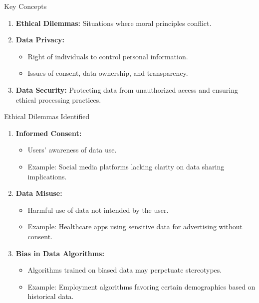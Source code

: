 \documentclass[aspectratio=169]{beamer}
\begin{document}
\begin{frame}[fragile]{Key Concepts}
  \begin{enumerate}
    \item \textbf{Ethical Dilemmas:} Situations where moral principles conflict.
    \item \textbf{Data Privacy:} 
      \begin{itemize}
        \item Right of individuals to control personal information.
        \item Issues of consent, data ownership, and transparency.
      \end{itemize}
    \item \textbf{Data Security:} Protecting data from unauthorized access and ensuring ethical processing practices.
  \end{enumerate}
\end{frame}

\begin{frame}[fragile]{Ethical Dilemmas Identified}
  \begin{enumerate}
    \item \textbf{Informed Consent:}
      \begin{itemize}
        \item Users' awareness of data use.
        \item Example: Social media platforms lacking clarity on data sharing implications.
      \end{itemize}
    \item \textbf{Data Misuse:}
      \begin{itemize}
        \item Harmful use of data not intended by the user.
        \item Example: Healthcare apps using sensitive data for advertising without consent.
      \end{itemize}
    \item \textbf{Bias in Data Algorithms:}
      \begin{itemize}
        \item Algorithms trained on biased data may perpetuate stereotypes.
        \item Example: Employment algorithms favoring certain demographics based on historical data.
      \end{itemize}
  \end{enumerate}
\end{frame}
\end{document}

